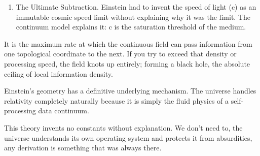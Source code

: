 \begin{enumerate}
\item The Ultimate Subtraction. Einstein had to invent the speed of light (c) as an immutable cosmic speed limit without explaining why it was the limit. The continuum model explains it: c is the saturation threshold of the medium.
\end{enumerate}

It is the maximum rate at which the continuous field can pass information from one topological coordinate to the next. If you try to exceed that density or processing speed, the field knots up entirely; forming a black hole, the absolute ceiling of local information density.

Einstein's geometry has a definitive underlying mechanism. The universe handles relativity completely naturally because it is simply the fluid physics of a self-processing data continuum.

This theory invents no constants without explanation. We don't need to, the universe understands its own operating system and protects it from absurdities, any derivation is something that was always there.


